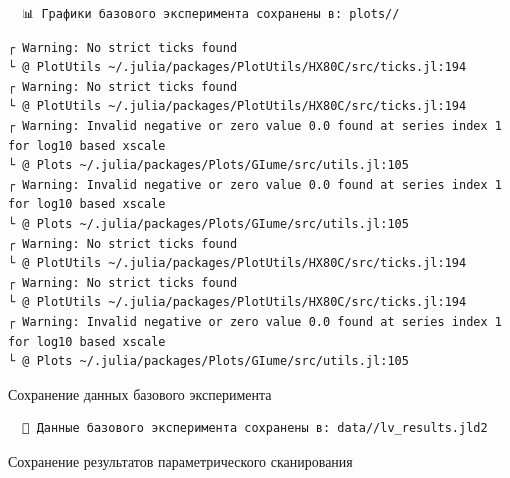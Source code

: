 \documentclass[
  12pt,
  a4paper,
  DIV=11,
  numbers=noendperiod]{scrreprt}
\newenvironment{Shaded}{\begin{snugshade}}{\end{snugshade}}
\newcommand{\FunctionTok}[1]{\textcolor[rgb]{0.28,0.35,0.67}{#1}}
\newcommand{\NormalTok}[1]{\textcolor[rgb]{0.00,0.23,0.31}{#1}}
\newcommand{\PreprocessorTok}[1]{\textcolor[rgb]{0.68,0.00,0.00}{#1}}
\newcommand{\SpecialCharTok}[1]{\textcolor[rgb]{0.37,0.37,0.37}{#1}}
\newcommand{\StringTok}[1]{\textcolor[rgb]{0.13,0.47,0.30}{#1}}
\begin{document}
\begin{verbatim}
  📊 Графики базового эксперимента сохранены в: plots//
\end{verbatim}

\begin{verbatim}
┌ Warning: No strict ticks found
└ @ PlotUtils ~/.julia/packages/PlotUtils/HX80C/src/ticks.jl:194
┌ Warning: No strict ticks found
└ @ PlotUtils ~/.julia/packages/PlotUtils/HX80C/src/ticks.jl:194
┌ Warning: Invalid negative or zero value 0.0 found at series index 1 for log10 based xscale
└ @ Plots ~/.julia/packages/Plots/GIume/src/utils.jl:105
┌ Warning: Invalid negative or zero value 0.0 found at series index 1 for log10 based xscale
└ @ Plots ~/.julia/packages/Plots/GIume/src/utils.jl:105
┌ Warning: No strict ticks found
└ @ PlotUtils ~/.julia/packages/PlotUtils/HX80C/src/ticks.jl:194
┌ Warning: No strict ticks found
└ @ PlotUtils ~/.julia/packages/PlotUtils/HX80C/src/ticks.jl:194
┌ Warning: Invalid negative or zero value 0.0 found at series index 1 for log10 based xscale
└ @ Plots ~/.julia/packages/Plots/GIume/src/utils.jl:105
\end{verbatim}

Сохранение данных базового эксперимента

\begin{Shaded}
\end{Shaded}

\begin{verbatim}
  📁 Данные базового эксперимента сохранены в: data//lv_results.jld2
\end{verbatim}

Сохранение результатов параметрического сканирования

\begin{Shaded}
\end{Shaded}
\end{document}
